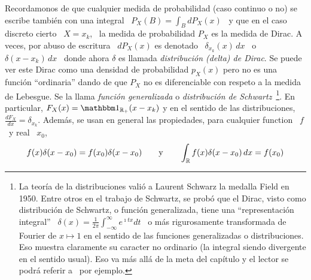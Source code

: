 
Recordamonos de  que cualquier  medida de probabilidad  (caso continuo o  no) se
escribe tambi\'en con una integral \ $\displaystyle P_X(B) = \int_B dP_X(x)$ \ y
que en el caso discreto cierto \ $X = x_k$, \ la medida de probabilidad $P_X$ es
la medida de  Dirac. A veces, por  abuso de escritura \ $dP_X(x)$  es denotado \
$\delta_{x_k}(x) \,  dx$ \ o \ $\delta(x-x_k)  \, dx$ \ donde  ahora $\delta$ es
llamada {\it distribuci\'on (delta) de Dirac}.  Se puede ver este Dirac como una
densidad de  probabilidad $p_X(x)$ \modif{con  respeto a la medida  de Lebesgue}
pero no  es una funci\'on ``ordinaria''  dando de que $P_X$  no es diferenciable
con respeto a la medida de Lebesgue.  Se la llama {\it funci\'on generalizada} o
{\it  distribuci\'on  de Schwartz}~\footnote{La  teor\'ia  de la  distribuciones
  vali\'o a Laurent Schwarz la medalla Field en 1950.  Entre otros en el trabajo
  de Schwartz, se prob\'o que el Dirac, visto como distribuci\'on de Schwartz, o
  funci\'on   generalizada,   tiene    una   ``representaci\'on   integral''   \
  $\displaystyle \delta(x) =  \frac{1}{2\pi} \int_{-\infty}^{\infty} e^{\imath t
    x} dt$ \  o m\'as rigurosamente transformada de Fourier de  $x \mapsto 1$ en
  el  sentido de  las  funciones generalizadas  o  distribuciones.  Eso  muestra
  claramente  su caracter  no ordinario  (la  integral siendo  divergente en  el
  sentido usual).  Eso va m\'as all\'a de  la meta del cap\'itulo y el lector se
  podr\'a  referir   a~\cite{Sch66,  GelShi64,  GelShi68}   por  ejemplo.}.   En
particular,   $F_X(x)  =   \un_{\Rset_+}(x-x_k)$  y   en  el   sentido   de  las
distribuciones, $\frac{d F_X}{dx} = \delta_{x_k}$.  Adem\'as, se usan en general
las propiedades, para cualquier function \ $f$ \ y real \ $x_0$,
%
\[
f(x) \delta(x-x_0) = f(x_0) \delta(x-x_0) \qquad \mbox{y} \qquad \int_{\mathbb{R}} f(x)
\delta(x-x_0) \, dx = f(x_0)
\]
